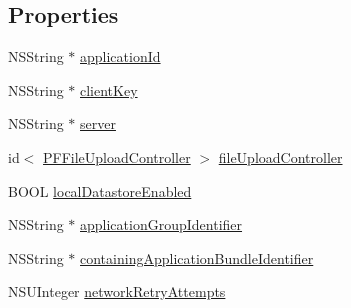 \subsection*{Properties}
\begin{DoxyCompactItemize}
\item 
N\+S\+String $\ast$ \hyperlink{interface_parse_client_configuration_a5d59beec752cc3904589557beaf3d1ed}{application\+Id}
\begin{DoxyCompactList}\small\item\em 

 \end{DoxyCompactList}\item 
N\+S\+String $\ast$ \hyperlink{interface_parse_client_configuration_aa03409b9cd2f80d746864df84e2cc4b3}{client\+Key}
\item 
N\+S\+String $\ast$ \hyperlink{interface_parse_client_configuration_ab81c2f80805bd75fa3e75bedae4b92b6}{server}
\item 
id$<$ \hyperlink{protocol_p_f_file_upload_controller-p}{P\+F\+File\+Upload\+Controller} $>$ \hyperlink{interface_parse_client_configuration_a5cc5a601fbe36c5acc1b047bf8084b89}{file\+Upload\+Controller}
\item 
B\+O\+O\+L \hyperlink{interface_parse_client_configuration_acea892ff4236f17a953bcf4da1236951}{local\+Datastore\+Enabled}
\begin{DoxyCompactList}\small\item\em 

 \end{DoxyCompactList}\item 
N\+S\+String $\ast$ \hyperlink{interface_parse_client_configuration_a7c2a0563d18d9a6f692574b7c74f46d7}{application\+Group\+Identifier}
\begin{DoxyCompactList}\small\item\em 

 \end{DoxyCompactList}\item 
N\+S\+String $\ast$ \hyperlink{interface_parse_client_configuration_aeb495f4191b53673494490d582440e08}{containing\+Application\+Bundle\+Identifier}
\item 
N\+S\+U\+Integer \hyperlink{interface_parse_client_configuration_a44d4faba8cf11762f2f065f1f39fbb11}{network\+Retry\+Attempts}
\begin{DoxyCompactList}\small\item\em 

 \end{DoxyCompactList}\end{DoxyCompactItemize}


